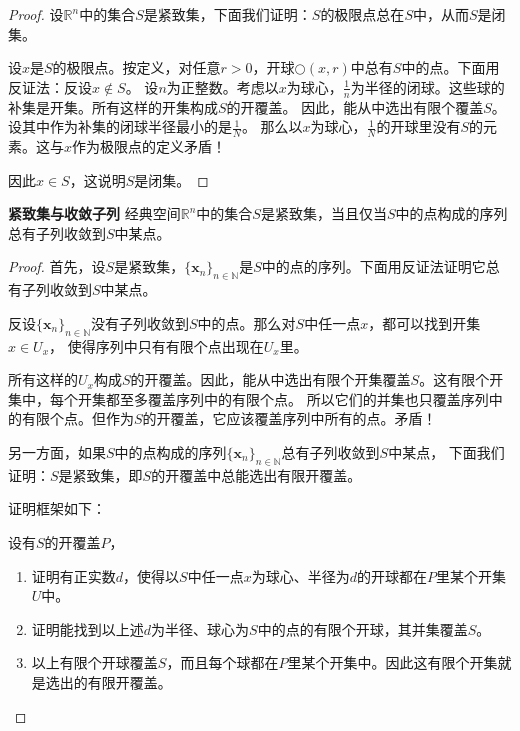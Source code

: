 \documentclass[12pt,UTF8,fontset=none]{ctexbook}
\begin{document}
\begin{appendix}
\begin{proof}
    设$\mathbb{R}^n$中的集合$S$是紧致集，下面我们证明：$S$的极限点总在$S$中，从而$S$是闭集。

    设$x$是$S$的极限点。按定义，对任意$r>0$，开球$\bigcirc(x, r)$中总有$S$中的点。下面用反证法：反设$x\notin S$。
    设$n$为正整数。考虑以$x$为球心，$\frac{1}{n}$为半径的闭球。这些球的补集是开集。所有这样的开集构成$S$的开覆盖。
    因此，能从中选出有限个覆盖$S$。设其中作为补集的闭球半径最小的是$\frac{1}{N}$。
    那么以$x$为球心，$\frac{1}{N}$的开球里没有$S$的元素。这与$x$作为极限点的定义矛盾！

    因此$x\in S$，这说明$S$是闭集。

\end{proof}

\begin{tm}{\textbf{紧致集与收敛子列}}\label{tm:b-2-20}
    经典空间$\mathbb{R}^n$中的集合$S$是紧致集，当且仅当$S$中的点构成的序列总有子列收敛到$S$中某点。
\end{tm}

\begin{proof}
    首先，设$S$是紧致集，$\{\mathbf{x}_n\}_{n\in\mathbb{N}}$是$S$中的点的序列。下面用反证法证明它总有子列收敛到$S$中某点。

    反设$\{\mathbf{x}_n\}_{n\in\mathbb{N}}$没有子列收敛到$S$中的点。那么对$S$中任一点$x$，都可以找到开集$x\in U_x$，
    使得序列中只有有限个点出现在$U_x$里。

    所有这样的$U_x$构成$S$的开覆盖。因此，能从中选出有限个开集覆盖$S$。这有限个开集中，每个开集都至多覆盖序列中的有限个点。
    所以它们的并集也只覆盖序列中的有限个点。但作为$S$的开覆盖，它应该覆盖序列中所有的点。矛盾！
    
    另一方面，如果$S$中的点构成的序列$\{\mathbf{x}_n\}_{n\in\mathbb{N}}$总有子列收敛到$S$中某点，
    下面我们证明：$S$是紧致集，即$S$的开覆盖中总能选出有限开覆盖。

    证明框架如下：

    设有$S$的开覆盖$P$，
    \begin{enumerate}
        \item 证明有正实数$d$，使得以$S$中任一点$x$为球心、半径为$d$的开球都在$P$里某个开集$U$中。
        \item 证明能找到以上述$d$为半径、球心为$S$中的点的有限个开球，其并集覆盖$S$。
        \item 以上有限个开球覆盖$S$，而且每个球都在$P$里某个开集中。因此这有限个开集就是选出的有限开覆盖。
    \end{enumerate}


\end{proof}
\end{appendix}
\end{document}
